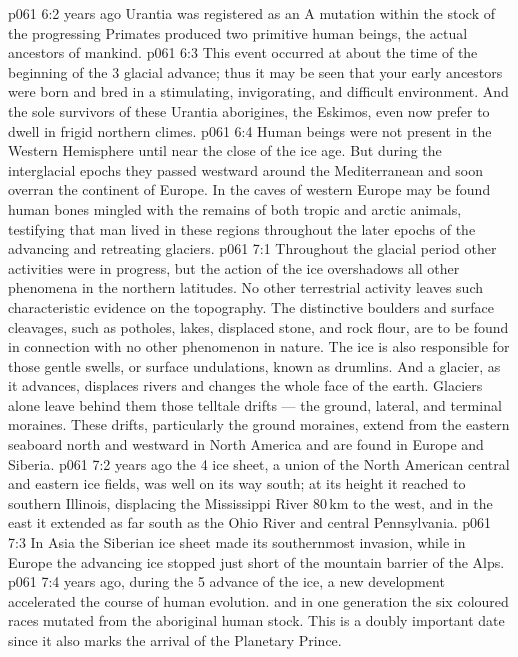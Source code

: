 \vs p061 6:2 \pc {} years ago Urantia was registered as an  A mutation within the stock of the progressing Primates  produced two primitive human beings, the actual ancestors of mankind.
\vs p061 6:3 This event occurred at about the time of the beginning of the 3 glacial advance; thus it may be seen that your early ancestors were born and bred in a stimulating, invigorating, and difficult environment. And the sole survivors of these Urantia aborigines, the Eskimos, even now prefer to dwell in frigid northern climes.
\vs p061 6:4 \pc Human beings were not present in the Western Hemisphere until near the close of the ice age. But during the interglacial epochs they passed westward around the Mediterranean and soon overran the continent of Europe. In the caves of western Europe may be found human bones mingled with the remains of both tropic and arctic animals, testifying that man lived in these regions throughout the later epochs of the advancing and retreating glaciers.
\vs p061 7:1 Throughout the glacial period other activities were in progress, but the action of the ice overshadows all other phenomena in the northern latitudes. No other terrestrial activity leaves such characteristic evidence on the topography. The distinctive boulders and surface cleavages, such as potholes, lakes, displaced stone, and rock flour, are to be found in connection with no other phenomenon in nature. The ice is also responsible for those gentle swells, or surface undulations, known as drumlins. And a glacier, as it advances, displaces rivers and changes the whole face of the earth. Glaciers alone leave behind them those telltale drifts --- the ground, lateral, and terminal moraines. These drifts, particularly the ground moraines, extend from the eastern seaboard north and westward in North America and are found in Europe and Siberia.
\vs p061 7:2 \pc {} years ago the 4 ice sheet, a union of the North American central and eastern ice fields, was well on its way south; at its height it reached to southern Illinois, displacing the Mississippi River 80\,km to the west, and in the east it extended as far south as the Ohio River and central Pennsylvania.
\vs p061 7:3 In Asia the Siberian ice sheet made its southernmost invasion, while in Europe the advancing ice stopped just short of the mountain barrier of the Alps.
\vs p061 7:4 \pc {} years ago, during the 5 advance of the ice, a new development accelerated the course of human evolution.  and in one generation the six coloured races mutated from the aboriginal human stock. This is a doubly important date since it also marks the arrival of the Planetary Prince.

